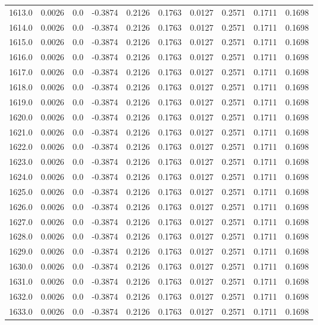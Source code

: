 \begin{longtable}{lrrrrrrrrr}
1613.0 & 0.0026 & 0.0 & -0.3874 & 0.2126 & 0.1763 & 0.0127 & 0.2571 & 0.1711 & 0.1698 \\
1614.0 & 0.0026 & 0.0 & -0.3874 & 0.2126 & 0.1763 & 0.0127 & 0.2571 & 0.1711 & 0.1698 \\
1615.0 & 0.0026 & 0.0 & -0.3874 & 0.2126 & 0.1763 & 0.0127 & 0.2571 & 0.1711 & 0.1698 \\
1616.0 & 0.0026 & 0.0 & -0.3874 & 0.2126 & 0.1763 & 0.0127 & 0.2571 & 0.1711 & 0.1698 \\
1617.0 & 0.0026 & 0.0 & -0.3874 & 0.2126 & 0.1763 & 0.0127 & 0.2571 & 0.1711 & 0.1698 \\
1618.0 & 0.0026 & 0.0 & -0.3874 & 0.2126 & 0.1763 & 0.0127 & 0.2571 & 0.1711 & 0.1698 \\
1619.0 & 0.0026 & 0.0 & -0.3874 & 0.2126 & 0.1763 & 0.0127 & 0.2571 & 0.1711 & 0.1698 \\
1620.0 & 0.0026 & 0.0 & -0.3874 & 0.2126 & 0.1763 & 0.0127 & 0.2571 & 0.1711 & 0.1698 \\
1621.0 & 0.0026 & 0.0 & -0.3874 & 0.2126 & 0.1763 & 0.0127 & 0.2571 & 0.1711 & 0.1698 \\
1622.0 & 0.0026 & 0.0 & -0.3874 & 0.2126 & 0.1763 & 0.0127 & 0.2571 & 0.1711 & 0.1698 \\
1623.0 & 0.0026 & 0.0 & -0.3874 & 0.2126 & 0.1763 & 0.0127 & 0.2571 & 0.1711 & 0.1698 \\
1624.0 & 0.0026 & 0.0 & -0.3874 & 0.2126 & 0.1763 & 0.0127 & 0.2571 & 0.1711 & 0.1698 \\
1625.0 & 0.0026 & 0.0 & -0.3874 & 0.2126 & 0.1763 & 0.0127 & 0.2571 & 0.1711 & 0.1698 \\
1626.0 & 0.0026 & 0.0 & -0.3874 & 0.2126 & 0.1763 & 0.0127 & 0.2571 & 0.1711 & 0.1698 \\
1627.0 & 0.0026 & 0.0 & -0.3874 & 0.2126 & 0.1763 & 0.0127 & 0.2571 & 0.1711 & 0.1698 \\
1628.0 & 0.0026 & 0.0 & -0.3874 & 0.2126 & 0.1763 & 0.0127 & 0.2571 & 0.1711 & 0.1698 \\
1629.0 & 0.0026 & 0.0 & -0.3874 & 0.2126 & 0.1763 & 0.0127 & 0.2571 & 0.1711 & 0.1698 \\
1630.0 & 0.0026 & 0.0 & -0.3874 & 0.2126 & 0.1763 & 0.0127 & 0.2571 & 0.1711 & 0.1698 \\
1631.0 & 0.0026 & 0.0 & -0.3874 & 0.2126 & 0.1763 & 0.0127 & 0.2571 & 0.1711 & 0.1698 \\
1632.0 & 0.0026 & 0.0 & -0.3874 & 0.2126 & 0.1763 & 0.0127 & 0.2571 & 0.1711 & 0.1698 \\
1633.0 & 0.0026 & 0.0 & -0.3874 & 0.2126 & 0.1763 & 0.0127 & 0.2571 & 0.1711 & 0.1698 \\

\end{longtable}
